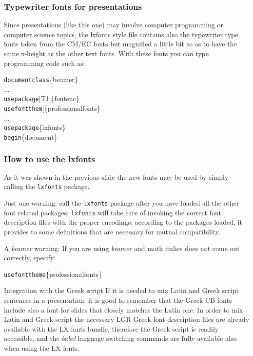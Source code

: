 \documentclass[usepdftitle=false]{beamer}\errorcontextlines=9
\newcommand*\cs[1]{\texttt{\char92#1}}
\newcommand\pack[1]{\textsl{#1}}
\begin{document}
\begin{frame}\frametitle{Typewriter fonts for presentations}
Since presentations (like this one) may involve computer programming or computer science topics, the lxfonts style file contains also the typewriter type fonts taken from the CM/EC fonts but magnified a little bit so as to have the same x-height as the other text fonts. With these fonts you can type programming code such as:
\begin{flushleft}\ttfamily
\cs{documentclass}\{beamer\}\\
...\\
\cs{usepackage}[T1]\{fontenc\}\\
\cs{usefontthem}[\{professionalfonts\}\\
...\\
\cs{usepackage}\{lxfonts\}\\
\cs{begin}\{document\}
\end{flushleft}
\end{frame}



\begin{frame}\frametitle{How to use the lxfonts}
As it was shown in the previous slide the new fonts may be used by simply calling the \texttt{lxfonts} package.

\alert{Just one warning}: call the \texttt{lxfonts} package after you have loaded all the other font related packages; \texttt{lxfonts} will take care of invoking the correct font description files with the proper encodings; according to the packages loaded, it provides to some definitions that are necessary for mutual compatibility.

\alert{A \textsl{beamer} warning}: If you are using \textsl{beamer} and math italics does not come out correctly, specify:
\begin{flushleft}\ttfamily
\cs{usefonttheme}\{professionalfonts\}
\end{flushleft}
\end{frame}

\begin{frame}{Integration with the Greek script}
If it is needed to mix Latin and Greek script sentences in a presentation, it is good to remember that the Greek CB fonts include also  a font for slides that closely matches the Latin one. In order to mix Latin and Greek script the necessary  LGR Greek font description files are already available with the LX fonts bundle, therefore the Greek script is readily accessible, and the \pack{babel} language switching commands are fully available also when using the LX fonts.
\end{frame}
\end{document}

